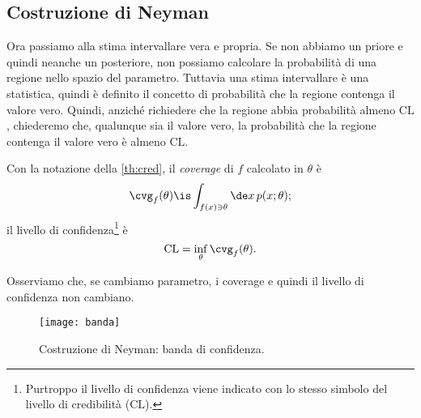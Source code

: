 
\subsection{Costruzione di Neyman}

Ora passiamo alla stima intervallare vera e propria.
Se non abbiamo un priore e quindi neanche un posteriore,
non possiamo calcolare la probabilità di una regione nello spazio del parametro.
Tuttavia una stima intervallare è una statistica,
quindi è definito il concetto di probabilità che la regione contenga il valore vero.
Quindi, anziché richiedere che la regione abbia probabilità almeno $\mathrm{CL}$,
chiederemo che,
qualunque sia il valore vero,
la probabilità che la regione contenga il valore vero è almeno $\mathrm{CL}$.

\begin{definition}[Coverage]
	Con la notazione della \autoref{th:cred},
	il \emph{coverage} di $f$ calcolato in $\theta$ è
	\begin{equation*}
		\cvg_f(\theta)
		\is \int_{f(x)\ni\theta} \de x\, p(x;\theta);
	\end{equation*}
	il livello di confidenza\footnote{Purtroppo il livello di confidenza viene indicato con lo stesso simbolo del livello di credibilità ($\mathrm{CL}$).} è
	\begin{equation*}
		\mathrm{CL}
		= \inf_\theta \cvg_f(\theta).
	\end{equation*}
\end{definition}

Osserviamo che,
se cambiamo parametro,
i coverage e quindi il livello di confidenza non cambiano.

\begin{figure}
	\centering
	\texttt{[image: banda]}
	\caption{\label{fig:neyman}%
	Costruzione di Neyman: banda di confidenza.}
\end{figure}

